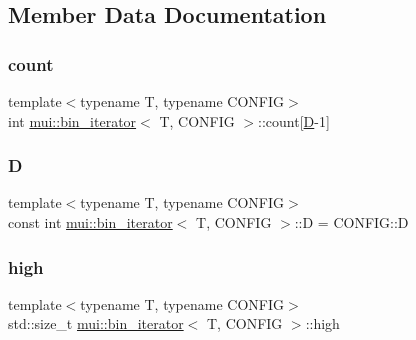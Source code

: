 \subsection{Member Data Documentation}
\mbox{\label{structmui_1_1bin__iterator_a97ebdd9e81da980a9a455eef380ebf6f}} 
\subsubsection{\texorpdfstring{count}{count}}
{\footnotesize\ttfamily template$<$typename T, typename C\+O\+N\+F\+IG$>$ \\
int \hyperlink{structmui_1_1bin__iterator}{mui\+::bin\+\_\+iterator}$<$ T, C\+O\+N\+F\+IG $>$\+::count\mbox{[}\hyperlink{structmui_1_1bin__iterator_acb6d849efa422c9c07a5866c3031a3f8}{D}-\/1\mbox{]}}

\mbox{\label{structmui_1_1bin__iterator_acb6d849efa422c9c07a5866c3031a3f8}} 
\subsubsection{\texorpdfstring{D}{D}}
{\footnotesize\ttfamily template$<$typename T, typename C\+O\+N\+F\+IG$>$ \\
const int \hyperlink{structmui_1_1bin__iterator}{mui\+::bin\+\_\+iterator}$<$ T, C\+O\+N\+F\+IG $>$\+::D = C\+O\+N\+F\+I\+G\+::D\hspace{0.3cm}{\ttfamily [static]}}

\mbox{\label{structmui_1_1bin__iterator_ac6914757b751e94ba6763d82faabbc2c}} 
\subsubsection{\texorpdfstring{high}{high}}
{\footnotesize\ttfamily template$<$typename T, typename C\+O\+N\+F\+IG$>$ \\
std\+::size\+\_\+t \hyperlink{structmui_1_1bin__iterator}{mui\+::bin\+\_\+iterator}$<$ T, C\+O\+N\+F\+IG $>$\+::high}

